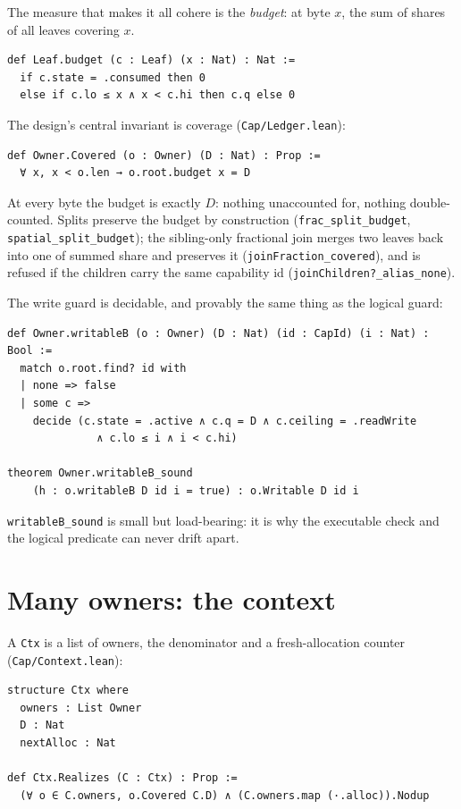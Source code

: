 \documentclass[10pt,a4paper]{article}
\newcommand{\file}[1]{\texttt{#1}}
\newcommand{\lean}[1]{\texttt{#1}}
\begin{document}
The measure that makes it all cohere is the \emph{budget}: at byte $x$, the sum
of shares of all leaves covering $x$.

\begin{lstlisting}
def Leaf.budget (c : Leaf) (x : Nat) : Nat :=
  if c.state = .consumed then 0
  else if c.lo ≤ x ∧ x < c.hi then c.q else 0
\end{lstlisting}

The design's central invariant is coverage (\file{Cap/Ledger.lean}):

\begin{lstlisting}
def Owner.Covered (o : Owner) (D : Nat) : Prop :=
  ∀ x, x < o.len → o.root.budget x = D
\end{lstlisting}

At every byte the budget is exactly $D$: nothing unaccounted for, nothing
double-counted. Splits preserve the budget by construction
(\lean{frac\_split\_budget}, \lean{spatial\_split\_budget}); the sibling-only
fractional join merges two leaves back into one of summed share and preserves it
(\lean{joinFraction\_covered}), and is refused if the children carry the same
capability id (\lean{joinChildren?\_alias\_none}).

The write guard is decidable, and provably the same thing as the logical guard:

\begin{lstlisting}
def Owner.writableB (o : Owner) (D : Nat) (id : CapId) (i : Nat) : Bool :=
  match o.root.find? id with
  | none => false
  | some c =>
    decide (c.state = .active ∧ c.q = D ∧ c.ceiling = .readWrite
              ∧ c.lo ≤ i ∧ i < c.hi)

theorem Owner.writableB_sound
    (h : o.writableB D id i = true) : o.Writable D id i
\end{lstlisting}

\lean{writableB\_sound} is small but load-bearing: it is why the executable
check and the logical predicate can never drift apart.

\section{Many owners: the context}

A \lean{Ctx} is a list of owners, the denominator and a fresh-allocation
counter (\file{Cap/Context.lean}):

\begin{lstlisting}
structure Ctx where
  owners : List Owner
  D : Nat
  nextAlloc : Nat

def Ctx.Realizes (C : Ctx) : Prop :=
  (∀ o ∈ C.owners, o.Covered C.D) ∧ (C.owners.map (·.alloc)).Nodup
\end{lstlisting}
\end{document}
